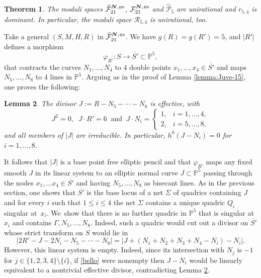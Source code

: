 \documentclass[JEP,XML,SOM,Unicode,NoEqCountersInSection,published]{cedram}
\newcommand{\ns}{{\mkern1mu\mathrm{ns}}}
\newcommand{\bN}{\boldsymbol{N}}
\theoremstyle{plain}
\newtheorem{thm}{Theorem}[section]
\newtheorem{lemma}[thm]{Lemma}
\theoremstyle{definition}
\newcommand\PP{{\mathbb P}}
\newcommand\F{{\mathcal F}}
\renewcommand\P{{\mathcal P}}
\newcommand\R{{\mathcal R}}
\begin{document}
\begin{thm}\label{54}
The moduli spaces $\widehat{\F}_{21}^{\bN,\ns}$, $\F_{21}^{\bN,\ns}$ and $\widehat\P_{5}$ are unirational and $r_{5,4}$ is dominant. In particular, the moduli space $\R_{5,4}$ is unirational, too.
\end{thm}

Take a general $(S,M,H,R)$ in $\widehat{\F}_{21}^{\bN,\ns}$.
We have $g(R)=g(R')=5$, and $|R'|$ defines a morphism\vspace*{-3pt}
\[
\varphi_{R'}:S\to \overline{S'}\subset \PP^5,
\]
that contracts the curves $N_1,\ldots,N_4$ to $4$ double points $x_1,\ldots,x_4\in \overline{S'}$ and maps $N_5,\ldots,N_8$ to $4$ lines in $\PP^5$.
Arguing as in the proof of Lemma \ref{lemma:Juve-15}, one proves the following:

\begin{lemma} \label{lemma:Juve-15-2}
The divisor
$J:=R-N_5-\cdots-N_8$
is effective, with\vspace*{-3pt}
\[
 J^2=0, \;\; J\cdot R'=6\;\; \mbox{and} \;\; J \cdot N_i =
\begin{cases}
1, & i=1,\ldots,4, \\
2, & i=5,\ldots,8,
\end{cases}
\]
and all members of $|J|$ are irreducible. In particular, $h^0(J-N_i)=0$ for $i=1,\ldots,8$. 
\end{lemma}

It follows that $|J|$ is a base point free elliptic pencil and that
$\varphi_{R'}$ maps any fixed smooth $J$ in its linear system
to an elliptic normal curve $J\subset \PP^5$ passing through the nodes $x_1,\ldots x_4\in \overline{S'}$ and having $N_5,\ldots,N_8$ as bisecant lines. As in the previous section, one shows that $\overline{S'}$ is the base locus of a net $\Sigma$ of quadrics containing $J$ and for every $i$ such that $1\leq i\leq 4$ the net $\Sigma$ contains a unique quadric $Q_i$ singular at~$x_i$. We~show that there is no further quadric in $\PP^5$ that is singular at $x_i$ and contains $\Gamma,N_5,\ldots,N_8$. Indeed, such a quadric would cut out a divisor on $\overline{S'}$ whose strict transform on $S$ would lie in
\begin{equation}\label{bello} |2R'-J-2N_i-N_5-\cdots -N_8|=|J+(N_1+N_2+N_3+N_4-N_i)-N_i |.
\end{equation}
However, this linear system is empty. Indeed, since its intersection with $N_j$ is $-1$ for $j \in \{1,2,3,4\} \setminus \{i\}$, if \eqref{bello} were nonempty then
$J-N_i$ would be linearly equivalent to a nontrivial effective divisor, contradicting Lemma \ref{lemma:Juve-15-2}.
\end{document}
